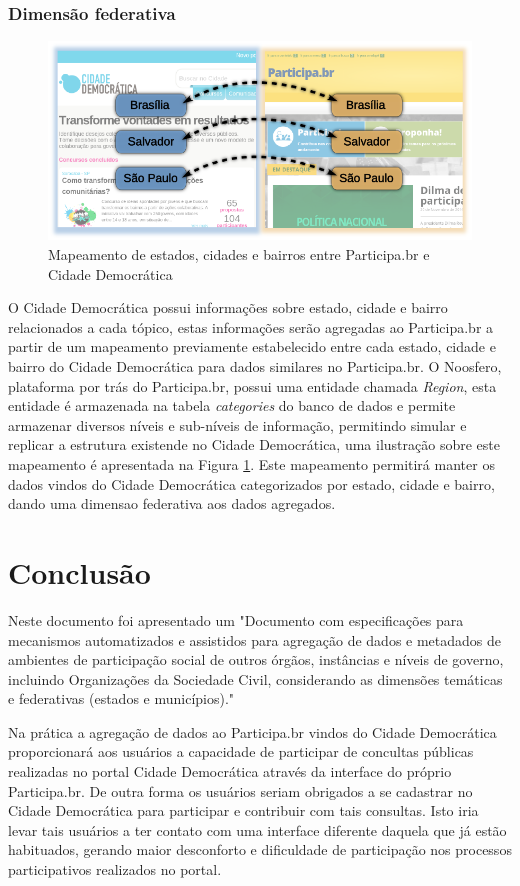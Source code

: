 \documentclass[12pt]{article}
\newcommand{\ProductDescription}{"Documento com especificações para mecanismos
  automatizados e assistidos para agregação de dados e metadados de ambientes
  de participação social de outros órgãos, instâncias e níveis de governo,
  incluindo Organizações da Sociedade Civil, considerando as dimensões
  temáticas e federativas (estados e municípios)."
}
\begin{document}
\subsubsection{Dimensão federativa}

\begin{figure}[h!]
\center
\includegraphics[scale=0.4]{mapeamento-cidades.png}
\caption{Mapeamento de estados, cidades e bairros entre Participa.br e Cidade
Democrática}
\label{mapeamento}
\end{figure}

O Cidade Democrática possui informações sobre estado, cidade e bairro
relacionados a cada tópico, estas informações serão agregadas ao Participa.br
a partir de um mapeamento previamente estabelecido entre cada estado, cidade e
bairro do Cidade Democrática para dados similares no Participa.br. O Noosfero,
plataforma por trás do Participa.br, possui uma entidade chamada {\it Region},
esta entidade é armazenada na tabela {\it categories} do banco de dados e
permite armazenar diversos níveis e sub-níveis de informação, permitindo
simular e replicar a estrutura existende no Cidade Democrática, uma ilustração
sobre este mapeamento é apresentada na Figura \ref{mapeamento}. Este
mapeamento permitirá manter os dados vindos do Cidade Democrática
categorizados por estado, cidade e bairro, dando uma dimensao federativa aos
dados agregados.

\section{Conclusão}

Neste documento foi apresentado um \ProductDescription

Na prática a agregação de dados ao Participa.br vindos do Cidade Democrática
proporcionará aos usuários a capacidade de participar de concultas públicas
realizadas no portal Cidade Democrática através da interface do próprio
Participa.br. De outra forma os usuários seriam obrigados a se cadastrar no
Cidade Democrática para participar e contribuir com tais consultas. Isto iria
levar tais usuários a ter contato com uma interface diferente daquela que já estão
habituados, gerando maior desconforto e dificuldade de participação nos
processos participativos realizados no portal.
\end{document}
